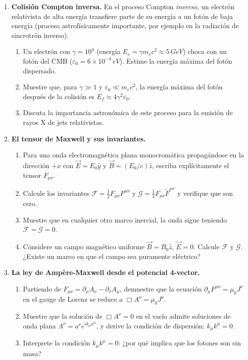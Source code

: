 \begin{enumerate}[leftmargin=2em, label=\textbf{P\thechapter.\arabic*.}]
  \item \textbf{Colisión Compton inversa.}
  En el proceso Compton \emph{inverso}, un electrón relativista de alta energía transfiere parte de su energía a un fotón de baja energía (proceso astrofísicamente importante, por ejemplo en la radiación de sincrotrón inverso).
  \begin{enumerate}[label=(\alph*)]
    \item Un electrón con $\gamma = 10^4$ (energía $E_e = \gamma m_e c^2 \approx 5\,\si{GeV}$) choca con un fotón del CMB ($\varepsilon_0 = 6\times10^{-4}\,\si{eV}$). Estime la energía máxima del fotón dispersado.
    \item Muestre que, para $\gamma\gg 1$ y $\varepsilon_0\ll m_ec^2$, la energía máxima del fotón después de la colisión es $E_f \approx 4\gamma^2\varepsilon_0$.
    \item Discuta la importancia astronómica de este proceso para la emisión de rayos X de jets relativistas.
  \end{enumerate}

  \item \textbf{El tensor de Maxwell y sus invariantes.}
  \begin{enumerate}[label=(\alph*)]
    \item Para una onda electromagnética plana monocromática propagándose en la dirección $+x$ con $\vec{E} = E_0\hat{y}$ y $\vec{B} = (E_0/c)\hat{z}$, escriba explícitamente el tensor $F_{\mu\nu}$.
    \item Calcule los invariantes $\mathcal{F} = \frac{1}{2}F_{\mu\nu}F^{\mu\nu}$ y $\mathcal{G} = \frac{1}{4}F_{\mu\nu}\tilde{F}^{\mu\nu}$ y verifique que son cero.
    \item Muestre que en cualquier otro marco inercial, la onda sigue teniendo $\mathcal{F} = \mathcal{G} = 0$.
    \item Considere un campo magnético uniforme $\vec{B} = B_0\hat{z}$, $\vec{E} = 0$. Calcule $\mathcal{F}$ y $\mathcal{G}$. ¿Existe un marco en que el campo sea puramente eléctrico?
  \end{enumerate}

  \item \textbf{La ley de Ampère-Maxwell desde el potencial 4-vector.}
  \begin{enumerate}[label=(\alph*)]
    \item Partiendo de $F_{\mu\nu} = \partial_\mu A_\nu - \partial_\nu A_\mu$, demuestre que la ecuación $\partial_\mu F^{\mu\nu} = \mu_0 J^\nu$ en el gauge de Lorenz se reduce a $\Box A^\nu = \mu_0 J^\nu$.
    \item Muestre que la solución de $\Box A^\nu = 0$ en el vacío admite soluciones de onda plana $A^\nu = a^\nu e^{ik_\mu x^\mu}$, y derive la condición de dispersión: $k_\mu k^\mu = 0$.
    \item Interprete la condición $k_\mu k^\mu = 0$: ¿por qué implica que los fotones son sin masa?
  \end{enumerate}


\end{enumerate}
